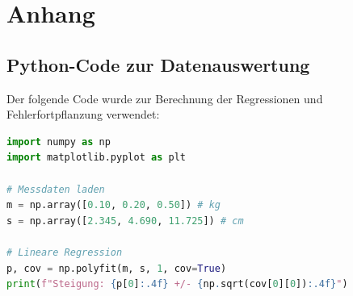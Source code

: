 \section{Anhang}

\subsection{Python-Code zur Datenauswertung}
Der folgende Code wurde zur Berechnung der Regressionen und Fehlerfortpflanzung verwendet:

\begin{lstlisting}[language=Python, caption={Auswertungsskript für Auslenkung und Trägheitsmoment}]
import numpy as np
import matplotlib.pyplot as plt

# Messdaten laden
m = np.array([0.10, 0.20, 0.50]) # kg
s = np.array([2.345, 4.690, 11.725]) # cm

# Lineare Regression
p, cov = np.polyfit(m, s, 1, cov=True)
print(f"Steigung: {p[0]:.4f} +/- {np.sqrt(cov[0][0]):.4f}")
\end{lstlisting}